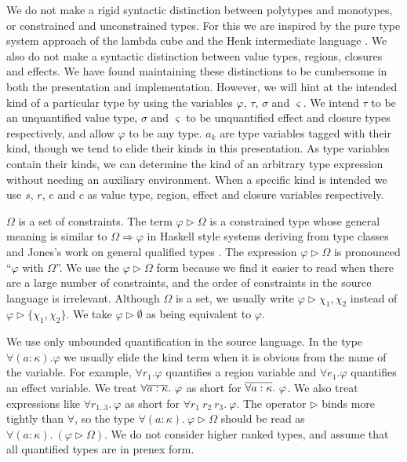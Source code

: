 We do not make a rigid syntactic distinction between polytypes and monotypes, or constrained and unconstrained types. For this we are inspired by the pure type system approach of the lambda cube and the Henk intermediate language \cite{peyton-jones:henk}. We also do not make a syntactic distinction between value types, regions, closures and effects. We have found maintaining these distinctions to be cumbersome in both the presentation and implementation. However, we will hint at the intended kind of a particular type by using the variables $\varphi$, $\tau$, $\sigma$ and $\varsigma$. We intend $\tau$ to be an unquantified value type, $\sigma$ and $\varsigma$ to be unquantified effect and closure types respectively, and allow $\varphi$ to be any type. $a_k$ are type variables tagged with their kind, though we tend to elide their kinds in this presentation. As type variables contain their kinds, we can determine the kind of an arbitrary type expression without needing an auxiliary environment. When a specific kind is intended we use $s$, $r$, $e$ and $c$ as value type, region, effect and closure variables respectively.

$\Omega$ is a set of constraints. The term $\varphi \rhd \Omega$ is a constrained type whose general meaning is similar to $\Omega \Rightarrow \varphi$ in Haskell style systems deriving from type classes \cite{wadler:less-ad-hoc} and Jones's work on general qualified types \cite{jones:qualified-types}. The expression $\varphi \rhd \Omega$ is pronounced ``$\varphi$ with $\Omega$''. We use the $\varphi \rhd \Omega$ form because we find it easier to read when there are a large number of constraints, and the order of constraints in the source language is irrelevant. Although $\Omega$ is a set, we usually write $\varphi \rhd \chi_1, \chi_2$ instead of $\varphi \rhd  \{ \chi_1, \chi_2 \}$. We take $\varphi \rhd \emptyset$ as being equivalent to $\varphi$. 

We use only unbounded quantification in the source language. In the type $\forall (a : \kappa). \varphi$ we usually elide the kind term when it is obvious from the name of the variable. For example, $\forall r_1. \varphi$ quantifies a region variable and $\forall e_1. \varphi$ quantifies an effect variable. We treat $\forall \overline{a : \kappa}. \ \varphi$ as short for $\ov{\forall a : \kappa}. \ \varphi$. We also treat expressions like $\forall r_{1..3}. \ \varphi$ as short for $\forall r_1 \ r_2 \ r_3. \ \varphi$. The operator $\rhd$ binds more tightly than $\forall$, so the type $\forall (a : \kappa). \ \varphi \rhd \Omega$ should be read as $\forall (a : \kappa). \ (\varphi \rhd \Omega)$. We do not consider higher ranked types, and assume that all quantified types are in prenex form.


